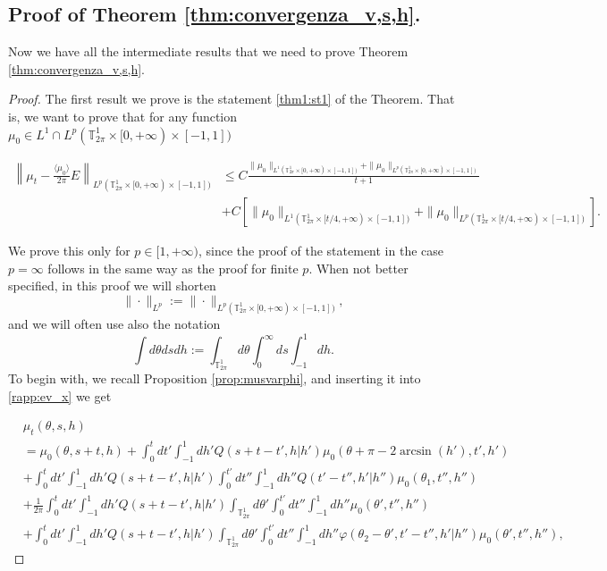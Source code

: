 \documentclass[a4paper,10pt,reqno]{amsart}
\numberwithin{equation}{subsection}
\numberwithin{figure}{subsection}
\begin{document}
\subsection{Proof of Theorem \ref{thm:convergenza_v,s,h}.}
Now we have all the intermediate results that we need to prove Theorem \ref{thm:convergenza_v,s,h}.
\begin{proof}
The first result we prove is the statement \eqref{thm1:st1} of the Theorem. That is, we want to prove that for any function $\mu_0\in L^1\cap L^p(\mathbb{T}^1_{2\pi}\times[0,+\infty)\times[-1,1])$

{\tiny\begin{align*}
\left\|\mu_t-\frac{\langle\mu_0\rangle}{2\pi}E\right\|_{L^p(\mathbb{T}^1_{2\pi}\times[0,+\infty)\times[-1,1])}&\leq C\frac{\|\mu_0\|_{L^1(\mathbb{T}^1_{2\pi}\times[0,+\infty)\times[-1,1])}+\|\mu_0\|_{L^p(\mathbb{T}^1_{2\pi}\times[0,+\infty)\times[-1,1])}}{t+1}
\\
&+C\left[\|\mu_0\|_{L^1(\mathbb{T}^1_{2\pi}\times[t/4,+\infty)\times[-1,1])}+\|\mu_0\|_{L^p(\mathbb{T}^1_{2\pi}\times[t/4,+\infty)\times[-1,1])}\right].
\end{align*}}

We prove this only for $p\in[1,+\infty)$, since the proof of the statement in the case $p=\infty$ follows in the same way as the proof for finite $p$. When not better specified, in this proof we will shorten 
\[
\|\cdot\|_{L^p}:=\|\cdot\|_{L^p(\mathbb{T}^1_{2\pi}\times[0,+\infty)\times[-1,1])},
\]
and we will often use also the notation
\[
\int d\theta dsdh:=\int_{\mathbb{T}^1_{2\pi}}d\theta\int_0^{\infty}ds\int_{-1}^1dh.
\]
To begin with, we recall Proposition \ref{prop:musvarphi}, and inserting it into \eqref{rapp:ev_x} we get

{\scriptsize\begin{align}
\nonumber&\mu_t(\theta,s,h)
\\
\nonumber&=\mu_0(\theta,s+t,h)+\int_0^tdt'\int_{-1}^1dh'Q(s+t-t',h|h')\mu_0(\theta+\pi-2\arcsin(h'),t',h')
\\
\nonumber&+\int_0^tdt'\int_{-1}^1dh'Q(s+t-t',h|h')\int_0^{t'}dt''\int_{-1}^1dh'' Q(t'-t'',h'|h'')\mu_0(\theta_1,t'',h'')
\\
\label{addendofico}&+\frac{1}{2\pi}\int_0^tdt'\int_{-1}^1dh'Q(s+t-t',h|h')\int_{\mathbb{T}^1_{2\pi}}d\theta'\int_0^{t'}dt''\int_{-1}^1dh''\mu_0(\theta',t'',h'')
\\
\nonumber&+\int_0^tdt'\int_{-1}^1dh'Q(s+t-t',h|h')\int_{\mathbb{T}^1_{2\pi}}d\theta'\int_0^{t'}dt''\int_{-1}^1dh''\varphi(\theta_2-\theta',t'-t'',h'|h'')\mu_0(\theta',t'',h''),
\end{align}}


\end{proof}
\end{document}
